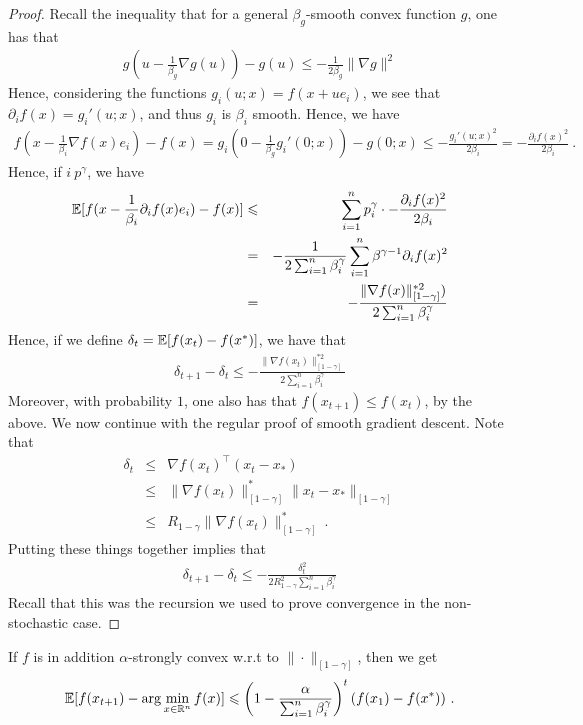 	\begin{proof}
	Recall the inequality that for a general $\beta_g$-smooth convex function $g$, one has that
	\begin{eqnarray}
    g\left(u - \frac{1}{\beta_g}\nabla g(u)\right) - g(u)
    \le -\frac{1}{2\beta_g} \|\nabla g\|^2
	\end{eqnarray}
	Hence, considering the functions $g_i(u;x) = f(x + ue_i)$, we see that $\partial_i f(x) = g_i'(u;x)$, and thus $g_i$ is $\beta_i$ smooth. Hence, we have 
	\begin{eqnarray}
    f\left(x - \frac{1}{\beta_i}\nabla f(x)e_i\right) - f(x)
    = g_i(0 - \frac{1}{\beta_g}g_i'(0;x)) - g(0;x)
    \le -\frac{g_i'(u;x)^2}{2\beta_i} = - \frac{\partial_i f(x)^2}{2\beta_i} \ .
	\end{eqnarray}
	Hence, if $i~p^\gamma$, we have
	\begin{eqnarray}
	  \operatorname*{\mathbb{E}}[f(x - \frac{1}{\beta_i}\partial_i f(x)e_i) - f(x)]
    &\leqslant& \sum_{i=1}^n p_i^\gamma \cdot - \frac{\partial_i f(x)^2}{2\beta_i}\\
	  &=& -\frac{1}{2\sum_{i=1}^n \beta_i^{\gamma}} \sum_{i=1}^n \beta^{\gamma - 1}\partial_i f(x)^2 \\
	  &=& -\frac{\|\nabla f(x)\|^{*2}_{[1-\gamma]})}{2\sum_{i=1}^n \beta_i^{\gamma}}
	\end{eqnarray}
	Hence, if we define $\delta_t = \operatorname*{\mathbb{E}}[f(x_t) - f(x^*)]$, we have that
	\begin{eqnarray}
	\delta_{t+1} - \delta_t \le -\frac{\|\nabla f(x_t)\|^{*2}_{[1-\gamma]}}{2\sum_{i=1}^n \beta_i^{\gamma}} 
	\end{eqnarray}
	Moreover, with probability $1$, one also has that $f(x_{t+1}) \le f(x_t)$, by the above. We now continue with the regular proof of smooth gradient descent. Note that
	\begin{eqnarray*}
	\delta_t &\le& \nabla f(x_t)^\top(x_t - x_*)\\
	&\le& \|\nabla f(x_t)\|_{[1-\gamma]}^*\|x_t - x_*\|_{[1-\gamma]}\\
	&\le& R_{1-\gamma}\|\nabla f(x_t)\|_{[1-\gamma]}^*\ .
	\end{eqnarray*}
	Putting these things together implies that
	\begin{eqnarray}
	\delta_{t+1} - \delta_t \le -\frac{\delta_t^2}{2R_{1-\gamma}^2\sum_{i=1}^n \beta_i^{\gamma}} 
	\end{eqnarray}
	Recall that this was the recursion we used to prove convergence in the non-stochastic case.
	\end{proof}
	\begin{theorem} If $f$ is in addition $\alpha$-strongly convex w.r.t to $\|\cdot\|_{[1-\gamma]}$, then we get 
	\begin{eqnarray}
    \operatorname*{\mathbb{E}}[f(x_{t+1}) - \arg\min_{x \in \mathbb{R}^{n}} f(x)]
    \leqslant \left(1 - \frac{\alpha}{\sum_{i=1}^n \beta_i^\gamma}\right)^t (f(x_1) - f(x^*)) \ .
	\end{eqnarray}
	\end{theorem}

